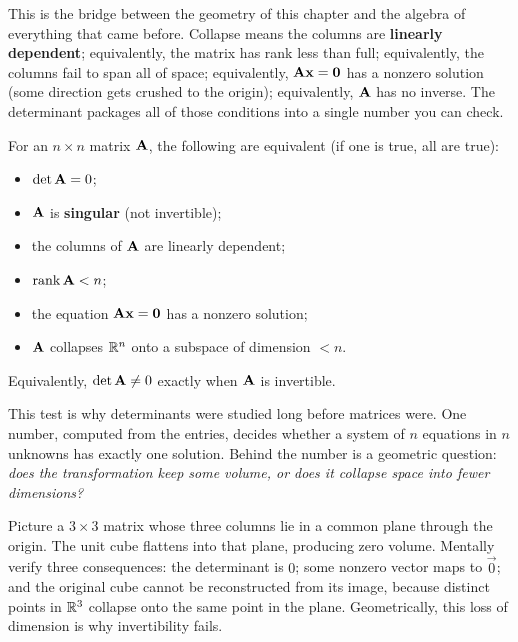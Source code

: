 This is the bridge between the geometry of this chapter and the algebra of
everything that came before. Collapse means the columns are \textbf{linearly
dependent}; equivalently, the matrix has rank less than full; equivalently, the
columns fail to span all of space; equivalently, $\mathbf{A}\mathbf{x} = \mathbf{0}$ has a
nonzero solution (some direction gets crushed to the origin); equivalently,
$\mathbf{A}$ has no inverse. The determinant packages all of those conditions into a
single number you can check.

\begin{formalbox}
For an $n\times n$ matrix $\mathbf{A}$, the following are equivalent (if one is
true, all are true):
\begin{itemize}
  \item $\det\mathbf{A} = 0$;
  \item $\mathbf{A}$ is \textbf{singular} (not invertible);
  \item the columns of $\mathbf{A}$ are linearly dependent;
  \item $\operatorname{rank}\mathbf{A} < n$;
  \item the equation $\mathbf{A}\mathbf{x} = \mathbf{0}$ has a nonzero solution;
  \item $\mathbf{A}$ collapses $\mathbb{R}^n$ onto a subspace of dimension $< n$.
\end{itemize}
Equivalently, $\det\mathbf{A}\neq 0$ exactly when $\mathbf{A}$ is invertible.
\end{formalbox}

\begin{aestheticbox}
This test is why determinants were studied long before
matrices were. One number, computed from the entries,
decides whether a system of $n$ equations in $n$ unknowns has exactly one solution.
Behind the number is a geometric question: \emph{does the
transformation keep some volume, or does it collapse space into fewer
dimensions?}
\end{aestheticbox}

\begin{walkbox}
Picture a $3\times 3$ matrix whose three columns lie in a common plane through
the origin. The unit cube flattens into that plane, producing zero volume.
Mentally verify three consequences: the determinant is $0$; some nonzero
vector maps to $\vec 0$; and the original cube cannot be reconstructed from its
image, because distinct points in $\mathbb{R}^3$ collapse onto the same point in the
plane. Geometrically, this loss of dimension is why invertibility fails.
\end{walkbox}

